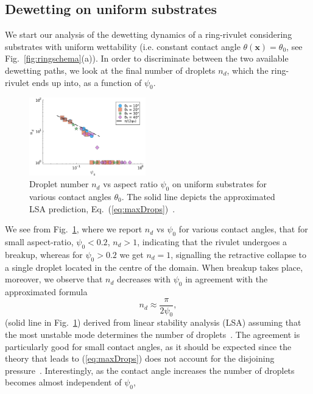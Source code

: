 \documentclass[twoside,twocolumn,9pt]{article}
\begin{document}
\subsection{Dewetting on uniform substrates}\label{subsec:drop-counting}
We start our analysis of the dewetting dynamics of a ring-rivulet considering substrates with uniform wettability (i.e. constant contact angle $\theta(\mathbf{x}) = \theta_0$, see Fig.~\ref{fig:ringschema}(a)). 
In order to discriminate between the two available dewetting paths, we look at the final number of droplets $n_d$, which the ring-rivulet ends up into, as a function of $\psi_0$.
\begin{figure}
    \centering
    \includegraphics[width=0.45\textwidth]{assets/Ndrops_uni_new.pdf}   
    \caption{Droplet number $n_d$ vs aspect ratio $\psi_0$ on uniform substrates for various contact angles $\theta_0$. 
    The solid line depicts the approximated LSA prediction, Eq.~(\ref{eq:maxDrops})~\cite{gonzalezStabilityLiquidRing2013}.}
    \label{fig:max_drops}
\end{figure}
We see from Fig.~\ref{fig:max_drops}, where we report $n_d$ vs $\psi_0$ for various contact angles, that for small aspect-ratio, $\psi_0 <0.2$, $n_d>1$, indicating that the rivulet undergoes a breakup, whereas for $\psi_0>0.2$ we get $n_d=1$, signalling the retractive collapse to a single droplet located in the centre of the domain.
When breakup takes place, moreover, we observe that $n_d$ decreases with $\psi_0$ in agreement with the approximated formula 
\begin{equation}\label{eq:maxDrops}
    n_d \approx \frac{\pi}{2\psi_0},
\end{equation}
(solid line in Fig.~\ref{fig:max_drops}) derived from linear stability analysis (LSA) assuming that the most unstable mode
determines the number of droplets~\cite{gonzalezStabilityLiquidRing2013}.
The agreement is particularly good for small contact angles, as it should be expected since the theory that
leads to (\ref{eq:maxDrops}) does not account for the disjoining pressure~\cite{gonzalezStabilityLiquidRing2013}. 
Interestingly, as the contact angle increases the number of droplets becomes almost independent of $\psi_0$,
\end{document}

